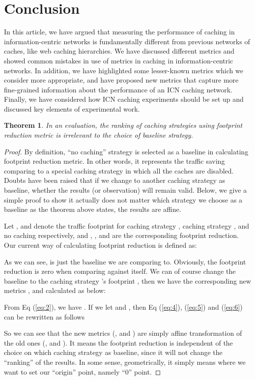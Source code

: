 \documentclass{sigcomm-alternate}
\newtheorem{mythm}{Theorem}
\begin{document}
\section{Conclusion}
\label{sec:conclusion}

In this article, we have argued that measuring the performance of caching in information-centric networks is fundamentally different from previous networks of caches, like web caching hierarchies.
We have discussed different metrics and showed common mistakes in use of metrics in caching in information-centric networks.
In addition, we have highlighted some lesser-known metrics which we consider more appropriate, and have proposed new metrics that capture more fine-grained information about the performance of an ICN caching network.
Finally, we have considered how ICN caching experiments should be set up and discussed key elements of experimental work.






\appendix
\begin{mythm}
In an evaluation, the ranking of caching strategies using footprint reduction metric is irrelevant to the choice of baseline strategy.
\end{mythm}

\begin{proof}
By definition, ``no caching'' strategy is selected as
a baseline in calculating footprint reduction metric. In other words, it
represents the traffic saving comparing to a special caching strategy
in which all the caches are disabled. Doubts have been raised that if
we change to another caching strategy as baseline, whether the results
(or observation) will remain valid. Below, we give a simple proof to
show it actually does not matter which strategy we choose as a
baseline as the theorem above states, the results are affine.

Let ,  and  denote the traffic
footprint for caching strategy , caching strategy , and
no caching  respectively, and , , and
 are the corresponding footprint reduction. Our current
way of calculating footprint reduction is defined as:


As we can see,  is just the baseline we are comparing
to. Obviously, the footprint reduction  is zero when
comparing against itself. We can of course change the baseline to the
caching strategy 's footprint , then we have the
corresponding new metrics ,  and
 calculated as below:


From Eq (\ref{eq:2}), we have . If we let  and , then Eq (\ref{eq:4}), (\ref{eq:5}) and
(\ref{eq:6}) can be rewritten as follows






So we can see that the new metrics (,  and
) are simply affine transformation of the old ones
(,  and ). It means the footprint
reduction is independent of the choice on which caching strategy as
baseline, since it will not change the ``ranking'' of the results.  In
some sense, geometrically, it simply means where we want to set our
``origin'' point, namely ``0'' point.
\end{proof}
\end{document}

